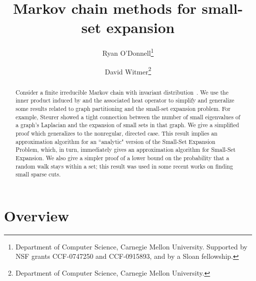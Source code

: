 \documentclass[11pt]{article}
\begin{document}
\title{Markov chain methods for small-set expansion}


\author{Ryan O'Donnell\thanks{Department of Computer Science, Carnegie Mellon University. Supported by NSF grants CCF-0747250 and CCF-0915893, and by a Sloan fellowship.} \and David Witmer\thanks{Department of Computer Science, Carnegie Mellon University.}}

\maketitle

\begin{abstract}
Consider a finite irreducible Markov chain with invariant distribution~.  We use the inner product induced by  and the associated heat operator to simplify and generalize some results related to graph partitioning and the small-set expansion problem.  For example, Steurer showed a tight connection between the number of small eigenvalues of a graph's Laplacian and the expansion of small sets in that graph. We give a simplified proof which generalizes to the nonregular, directed case. This result implies an approximation algorithm for an ``analytic" version of the Small-Set Expansion Problem, which, in turn, immediately gives an approximation algorithm for Small-Set Expansion.  We also give a simpler proof of a lower bound on the probability that a random walk stays within a set; this result was used in some recent works on finding small sparse cuts.

\end{abstract}

\section{Overview}
\end{document}
